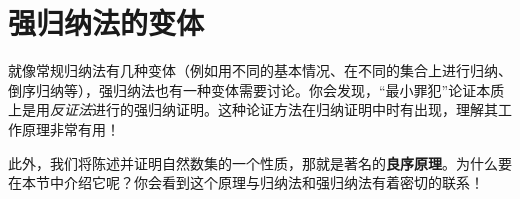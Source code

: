 \section{强归纳法的变体}

就像常规归纳法有几种变体（例如用不同的基本情况、在不同的集合上进行归纳、倒序归纳等），强归纳法也有一种变体需要讨论。你会发现，``最小罪犯''论证本质上是用\emph{反证法}进行的强归纳证明。这种论证方法在归纳证明中时有出现，理解其工作原理非常有用！

此外，我们将陈述并证明自然数集的一个性质，那就是著名的\textbf{良序原理}。为什么要在本节中介绍它呢？你会看到这个原理与归纳法和强归纳法有着密切的联系！





